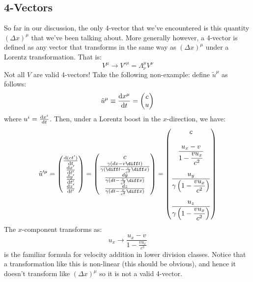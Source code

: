 \subsection{4-Vectors}
So far in our discussion, the only 4-vector that we've encountered is this quantity \( (\Delta x)^{\mu} \)
that we've been talking about. More generally however, a 4-vector is defined as any vector that transforms in
the same way as \( (\Delta x)^{\mu} \) under a Lorentz transformation. That is:
\[
	V^{\mu} \to V'^{\mu} = \Lambda^{\mu}_\nu V^{\nu}
\]	
Not all \( V \) are valid 4-vectors! Take the following non-example: define \( \tilde u^{\mu} \) as follows:
\[
	\tilde u^{\mu} \equiv \dv{x^{\mu}}{t} = \begin{pmatrix} c \\ u \end{pmatrix}
\]
where \( u^{i} = \dv{x^{i}}{t} \). Then, under a Lorentz boost in the \( x \)-direction, we have:
\[
	\tilde u'^{\mu} = \begin{pmatrix} \dv{(ct')}{t}\\ \dv{x'}{t'} \\ \dv{y'}{t'} \\
	\dv{z'}{t'} \end{pmatrix} = \begin{pmatrix} c \\ \frac{\gamma(dx - v \diff t)}{\gamma
	(\diff t - \frac{v}{c^2} \diff x)}\\ \frac{dy}{\gamma(dt - \frac{v}{c^2} \diff x)} \\
	\frac{dz}{\gamma(dt - \frac{v}{c^2} \diff x)} \end{pmatrix} = 
	\begin{pmatrix} c \\ 
	\\
	\dfrac{u_x - v}{1 - \dfrac{v u_x}{c^2}} \\ 
	\\
	\dfrac{u_y}{\gamma\left( 1 - \dfrac{v u_x}{c^2} \right)}\\ 
	\\
	\dfrac{u_z}{\gamma\left( 1 - \dfrac{v u_x}{c^2} \right)}\end{pmatrix}
\]
The \( x \)-component transforms as:
\[
	u_x \to \frac{u_x - v}{1 - \frac{v u_x}{c^2}}
\]
is the familiar formula for velocity addition in lower division classes. Notice that a transformation like
this is non-linear (this should be obvious), and hence it doesn't transform like \( (\Delta x)^{\mu} \) so it
is not a valid 4-vector. 

